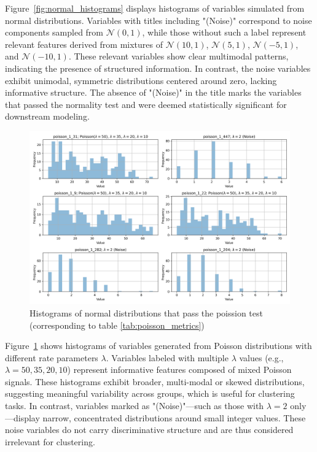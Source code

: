 Figure~\ref{fig:normal_histograms} displays histograms of variables simulated from normal distributions.
Variables with titles including "(Noise)" correspond to noise components sampled from $\mathcal{N}(0,1)$,
while those without such a label represent relevant features derived from mixtures of $\mathcal{N}(10,1)$, 
$\mathcal{N}(5,1)$, $\mathcal{N}(-5,1)$, and $\mathcal{N}(-10,1)$. 
These relevant variables show clear multimodal patterns, indicating the presence of structured information.
In contrast, the noise variables exhibit unimodal, symmetric distributions centered around zero, 
lacking informative structure. The absence of "(Noise)" in the title marks the variables that
passed the normality test and were deemed statistically significant for downstream modeling.

\begin{figure}[!h]
    \centering
    \includegraphics[width=0.9\linewidth]{../results/sim_valid_poisson_distribution.png}
    \caption{Histograms of normal distributions that pass the poission test (corresponding to table \ref{tab:poisson_metrics})}
    \label{fig:poisson_histograms}
\end{figure}

Figure~\ref{fig:poisson_histograms} shows histograms of variables generated from Poisson distributions with different
rate parameters $\lambda$. Variables labeled with multiple $\lambda$ values (e.g., $\lambda = 50, 35, 20, 10$) 
represent informative features composed of mixed Poisson signals. These histograms exhibit broader, multi-modal 
or skewed distributions, suggesting meaningful variability across groups, which is useful for clustering tasks. 
In contrast, variables marked as "(Noise)"—such as those with $\lambda = 2$ only—display narrow, 
concentrated distributions around small integer values. These noise variables do not carry discriminative 
structure and are thus considered irrelevant for clustering.

